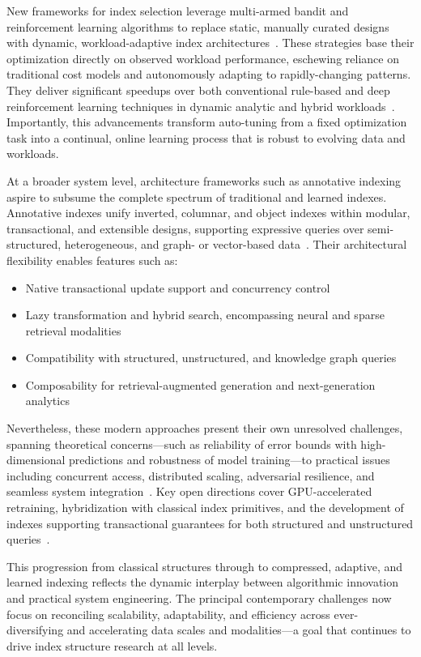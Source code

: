 \documentclass[sigconf]{acmart}
\begin{document}
New frameworks for index selection leverage multi-armed bandit and reinforcement learning algorithms to replace static, manually curated designs with dynamic, workload-adaptive index architectures~\cite{ref105}. These strategies base their optimization directly on observed workload performance, eschewing reliance on traditional cost models and autonomously adapting to rapidly-changing patterns. They deliver significant speedups over both conventional rule-based and deep reinforcement learning techniques in dynamic analytic and hybrid workloads~\cite{ref105}. Importantly, this advancements transform auto-tuning from a fixed optimization task into a continual, online learning process that is robust to evolving data and workloads.

At a broader system level, architecture frameworks such as annotative indexing aspire to subsume the complete spectrum of traditional and learned indexes. Annotative indexes unify inverted, columnar, and object indexes within modular, transactional, and extensible designs, supporting expressive queries over semi-structured, heterogeneous, and graph- or vector-based data~\cite{ref112}. Their architectural flexibility enables features such as:
\begin{itemize}
    \item Native transactional update support and concurrency control
    \item Lazy transformation and hybrid search, encompassing neural and sparse retrieval modalities
    \item Compatibility with structured, unstructured, and knowledge graph queries
    \item Composability for retrieval-augmented generation and next-generation analytics
\end{itemize}

Nevertheless, these modern approaches present their own unresolved challenges, spanning theoretical concerns---such as reliability of error bounds with high-dimensional predictions and robustness of model training---to practical issues including concurrent access, distributed scaling, adversarial resilience, and seamless system integration~\cite{ref105,ref110,ref111,ref112}. Key open directions cover GPU-accelerated retraining, hybridization with classical index primitives, and the development of indexes supporting transactional guarantees for both structured and unstructured queries~\cite{ref111,ref112}.

This progression from classical structures through to compressed, adaptive, and learned indexing reflects the dynamic interplay between algorithmic innovation and practical system engineering. The principal contemporary challenges now focus on reconciling scalability, adaptability, and efficiency across ever-diversifying and accelerating data scales and modalities---a goal that continues to drive index structure research at all levels.
\end{document}
